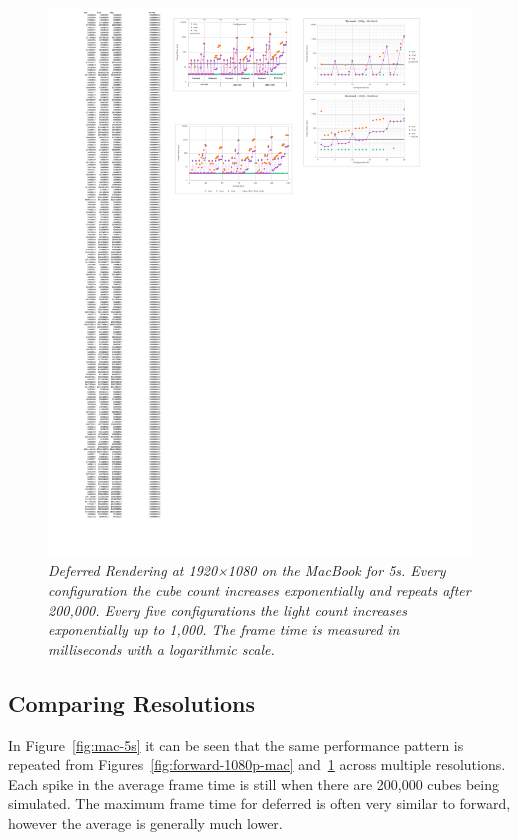 \documentclass[11pt]{article}
\begin{document}
\begin{figure}[h!]
  \begin{center}
    \includegraphics[width=1\columnwidth]{../deferred-1080p-mac.pdf}
  \end{center}
  \caption[Deferred 1080p]{
    \emph{
      Deferred Rendering at 1920×1080 on the MacBook for 5s.
      Every configuration the cube count increases exponentially and repeats after 200,000.
      Every five configurations the light count increases exponentially up to 1,000.
      The frame time is measured in milliseconds with a logarithmic scale.
    }
  }\label{fig:deferred-1080p-mac}
\end{figure}

\subsection{Comparing Resolutions}
In Figure~\ref{fig:mac-5s} it can be seen that the same performance pattern is repeated from Figures~\ref{fig:forward-1080p-mac} and~\ref{fig:deferred-1080p-mac} across multiple resolutions.
Each spike in the average frame time is still when there are 200,000 cubes being simulated.
The maximum frame time for deferred is often very similar to forward, however the average is generally much lower.
\end{document}
